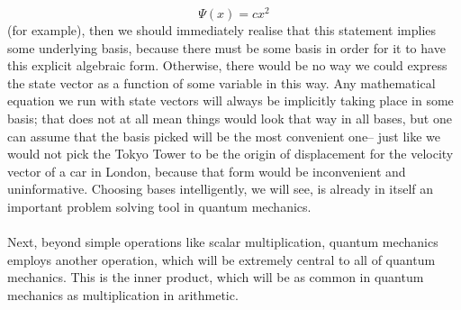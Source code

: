 $$
\Psi(x)=cx^{2}
$$
(for example), then we should immediately realise that this statement implies some underlying basis, because there must be some basis in order for it to have this explicit algebraic form. Otherwise, there would be no way we could express the state vector as a function of some variable in this way. Any mathematical equation we run with state vectors will always be implicitly taking place in some basis; that does not at all mean things would look that way in all bases, but one can assume that the basis picked will be the most convenient one-- just like we would not pick the Tokyo Tower to be the origin of displacement for the velocity vector of a car in London, because that form would be inconvenient and uninformative. Choosing bases intelligently, we will see, is already in itself an important problem solving tool in quantum mechanics.  
\\\\
Next, beyond simple operations like scalar multiplication, quantum mechanics employs another operation, which will be extremely central to all of quantum mechanics. This is the inner product, which will be as common in quantum mechanics as multiplication in arithmetic.

